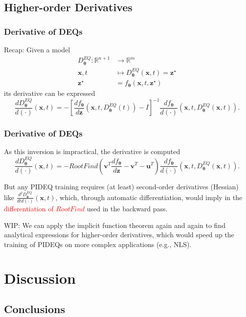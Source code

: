 \documentclass[t]{beamer}
\newcommand{\R}{\mathbb{R}}
\begin{document}
\subsection{Higher-order Derivatives}

\begin{frame}
    \frametitle{Derivative of DEQs}
    Recap:
    Given a model
    \begin{align*}
	D^{EQ}_{\bm{\theta}}: \R^{n+1} &\longrightarrow \R^{m} \\
	\bm{x},t &\longmapsto 	D^{EQ}_{\bm{\theta}}(\bm{x},t) = \bm{z}^{\star} \\
	\bm{z}^{\star} &= f_{\bm{\theta}}\left( \bm{x},t, \bm{z}^{\star} \right)
    \end{align*}
    its derivative can be expressed \[
    \frac{d D^{EQ}_{\bm{\theta}}}{d (\cdot)}(\bm{x},t) = - \left[ \frac{d f_{\bm{\theta}}}{d \bm{z}}(\bm{x},t,D^{EQ}_{\bm{\theta}}(t)) - I \right]^{-1} \frac{d f_{\bm{\theta}}}{d (\cdot)}(\bm{x},t,D^{EQ}_{\bm{\theta}}(\bm{x},t))
    .\] 
\end{frame}

\begin{frame}
    \frametitle{Derivative of DEQs}
    As this inversion is impractical, the derivative is computed \[
	\frac{d D^{EQ}_{\bm{\theta}}}{d (\cdot)}(\bm{x},t) = - RootFind\left( \bm{v}^T\frac{d f_{\bm{\theta}}}{d \bm{z}} -\bm{v}^T - \bm{u}^T  \right)  \frac{d f_{\bm{\theta}}}{d (\cdot)}(\bm{x},t,D^{EQ}_{\bm{\theta}}(\bm{x},t))
    .\] \pause

    But any PIDEQ training requires (at least) second-order derivatives (Hessian) like $\frac{d^2 D^{EQ}_{\bm{\theta}}}{d t d (\cdot)}(\bm{x},t)$, which, through automatic differentiation, would imply in the \textcolor{red}{differentiation of $RootFind$} used in the backward pass. \pause

    WIP: We can apply the implicit function theorem again and again to find analytical expressions for higher-order derivatives, which would speed up the training of PIDEQs on more complex applications (e.g., NLS).
\end{frame}

\section{Discussion}

\subsection{Conclusions}
\end{document}
